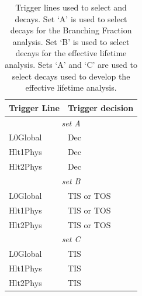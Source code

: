 \begin{table}[htbp]
\begin{center}
\begin{tabular}{ll}
\hline
Trigger Line	& Trigger decision \\ \hline
\multicolumn{2}{c}{{\it set A}} \\ \hline
L0Global	& Dec\\
Hlt1Phys	& Dec \\
Hlt2Phys	& Dec \\ \hline
\multicolumn{2}{c}{{\it set B}} \\ \hline
L0Global	& TIS or TOS \\
Hlt1Phys	& TIS or TOS \\
Hlt2Phys	& TIS or TOS \\ \hline
\multicolumn{2}{c}{{\it set C}} \\ \hline
L0Global	& TIS\\
Hlt1Phys	& TIS \\
Hlt2Phys	& TIS \\ \hline
\end{tabular}
\vspace{0.7cm}
\caption{Trigger lines used to select \bsmumu and \bhh decays. Set `A' is used to select decays for the Branching Fraction analysis. Set `B' is used to select \bsmumu decays for the effective lifetime analysis. Sets `A' and `C' are used to select \bhh decays used to develop the \bsmumu effective lifetime analysis.}
\label{tab:triggers}
\end{center}
\end{table}

